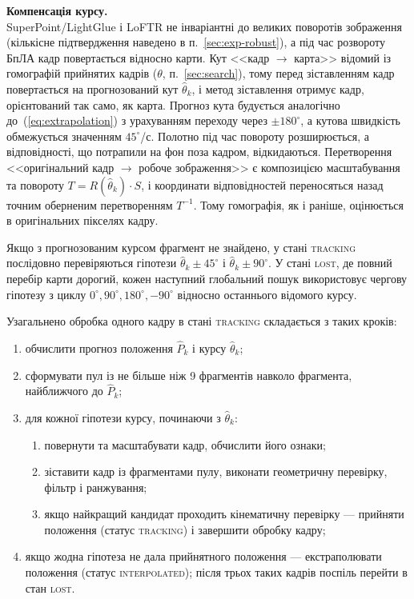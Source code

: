 \textbf{Компенсація курсу.}\\
SuperPoint/LightGlue і LoFTR не інваріантні до великих поворотів зображення (кількісне підтвердження наведено в п.~\ref{sec:exp-robust}), а під час розвороту БпЛА кадр повертається відносно карти. Кут <<кадр $\to$ карта>> відомий із гомографій прийнятих кадрів ($\theta$, п.~\ref{sec:search}), тому перед зіставленням кадр повертається на прогнозований кут $\hat{\theta}_k$, і метод зіставлення отримує кадр, орієнтований так само, як карта. Прогноз кута будується аналогічно до~(\ref{eq:extrapolation}) з урахуванням переходу через $\pm 180^\circ$, а кутова швидкість обмежується значенням $45^\circ$/с. Полотно під час повороту розширюється, а відповідності, що потрапили на фон поза кадром, відкидаються. Перетворення <<оригінальний кадр $\to$ робоче зображення>> є композицією масштабування та повороту $T = R(\hat{\theta}_k) \cdot S$, і координати відповідностей переносяться назад точним оберненим перетворенням $T^{-1}$. Тому гомографія, як і раніше, оцінюється в оригінальних пікселях кадру.

Якщо з прогнозованим курсом фрагмент не знайдено, у стані \textsc{tracking} послідовно перевіряються гіпотези $\hat{\theta}_k \pm 45^\circ$ і $\hat{\theta}_k \pm 90^\circ$. У стані \textsc{lost}, де повний перебір карти дорогий, кожен наступний глобальний пошук використовує чергову гіпотезу з циклу $0^\circ, 90^\circ, 180^\circ, -90^\circ$ відносно останнього відомого курсу.

Узагальнено обробка одного кадру в стані \textsc{tracking} складається з таких кроків:
\begin{enumerate}
    \item обчислити прогноз положення $\hat{P}_k$ і курсу $\hat{\theta}_k$;
    \item сформувати пул із не більше ніж 9 фрагментів навколо фрагмента, найближчого до $\hat{P}_k$;
    \item для кожної гіпотези курсу, починаючи з $\hat{\theta}_k$:
    \begin{enumerate}
        \item повернути та масштабувати кадр, обчислити його ознаки;
        \item зіставити кадр із фрагментами пулу, виконати геометричну перевірку, фільтр і ранжування;
        \item якщо найкращий кандидат проходить кінематичну перевірку --- прийняти положення (статус \textsc{tracking}) і завершити обробку кадру;
    \end{enumerate}
    \item якщо жодна гіпотеза не дала прийнятного положення --- екстраполювати положення (статус \textsc{interpolated}); після трьох таких кадрів поспіль перейти в стан \textsc{lost}.
\end{enumerate}


